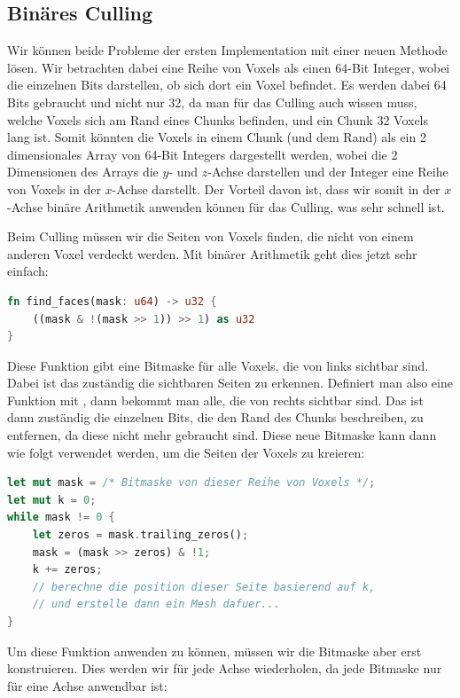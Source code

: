 \subsection{Binäres Culling}

Wir können beide Probleme der ersten Implementation
mit einer neuen Methode lösen.
Wir betrachten dabei eine Reihe von Voxels als einen
64-Bit Integer, wobei die einzelnen Bits darstellen,
ob sich dort ein Voxel befindet.
Es werden dabei 64 Bits gebraucht und nicht nur 32,
da man für das Culling auch wissen muss,
welche Voxels sich am Rand eines Chunks befinden,
und ein Chunk 32 Voxels lang ist.
Somit könnten die Voxels in einem Chunk
(und dem Rand) als ein 2 dimensionales
Array von 64-Bit Integers dargestellt werden,
wobei die 2 Dimensionen des Arrays die
$y$- und $z$-Achse darstellen und der Integer eine
Reihe von Voxels in der $x$-Achse darstellt.
Der Vorteil davon ist, dass wir somit in der
$x$-Achse binäre Arithmetik anwenden können für
das Culling, was sehr schnell ist.

Beim Culling müssen wir die Seiten von
Voxels finden, die nicht von einem anderen Voxel
verdeckt werden.
Mit binärer Arithmetik geht dies jetzt sehr einfach:

\begin{lstlisting}[language=Rust]
fn find_faces(mask: u64) -> u32 {
	((mask & !(mask >> 1)) >> 1) as u32
}
\end{lstlisting}
%
Diese Funktion gibt eine Bitmaske für alle Voxels,
die von links sichtbar sind.
Dabei ist das  zuständig
die sichtbaren Seiten zu erkennen.
Definiert man also eine Funktion mit
, dann bekommt man alle,
die von rechts sichtbar sind.
Das  ist dann zuständig
die einzelnen Bits, die den Rand des Chunks beschreiben,
zu entfernen, da diese nicht mehr gebraucht sind.
Diese neue Bitmaske kann dann wie folgt verwendet
werden, um die Seiten der Voxels zu kreieren:

\begin{lstlisting}[language=Rust]
let mut mask = /* Bitmaske von dieser Reihe von Voxels */;
let mut k = 0;
while mask != 0 {
	let zeros = mask.trailing_zeros();
	mask = (mask >> zeros) & !1;
	k += zeros;
	// berechne die position dieser Seite basierend auf k,
	// und erstelle dann ein Mesh dafuer...
}
\end{lstlisting}

Um diese Funktion anwenden zu können, müssen
wir die Bitmaske aber erst konstruieren.
Dies werden wir für jede Achse wiederholen,
da jede Bitmaske nur für eine Achse anwendbar ist:

